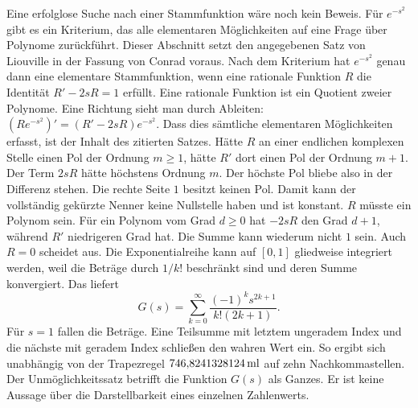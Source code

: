 Eine erfolglose Suche nach einer Stammfunktion wäre noch kein Beweis. Für \(e^{-s^2}\) gibt es ein Kriterium, das alle elementaren Möglichkeiten auf eine Frage über Polynome zurückführt. Dieser Abschnitt setzt den angegebenen Satz von Liouville in der Fassung von Conrad voraus.
Nach dem Kriterium hat \(e^{-s^2}\) genau dann eine elementare Stammfunktion, wenn eine rationale Funktion \(R\) die Identität \(R'-2sR=1\) erfüllt. Eine rationale Funktion ist ein Quotient zweier Polynome. Eine Richtung sieht man durch Ableiten: \((Re^{-s^2})'=(R'-2sR)e^{-s^2}\). Dass dies sämtliche elementaren Möglichkeiten erfasst, ist der Inhalt des zitierten Satzes.
Hätte \(R\) an einer endlichen komplexen Stelle einen Pol der Ordnung \(m\ge1\), hätte \(R'\) dort einen Pol der Ordnung \(m+1\). Der Term \(2sR\) hätte höchstens Ordnung \(m\). Der höchste Pol bliebe also in der Differenz stehen. Die rechte Seite \(1\) besitzt keinen Pol. Damit kann der vollständig gekürzte Nenner keine Nullstelle haben und ist konstant. \(R\) müsste ein Polynom sein. Für ein Polynom vom Grad \(d\ge0\) hat \(-2sR\) den Grad \(d+1\), während \(R'\) niedrigeren Grad hat. Die Summe kann wiederum nicht \(1\) sein. Auch \(R=0\) scheidet aus.
Die Exponentialreihe kann auf \([0,1]\) gliedweise integriert werden, weil die Beträge durch \(1/k!\) beschränkt sind und deren Summe konvergiert. Das liefert
\[
 G(s)=\sum_{k=0}^\infty\frac{(-1)^k s^{2k+1}}{k!(2k+1)}.
\]
Für \(s=1\) fallen die Beträge. Eine Teilsumme mit letztem ungeradem Index und die nächste mit geradem Index schließen den wahren Wert ein. So ergibt sich unabhängig von der Trapezregel \(746{,}8241328124\,\mathrm{ml}\) auf zehn Nachkommastellen. Der Unmöglichkeitssatz betrifft die Funktion \(G(s)\) als Ganzes. Er ist keine Aussage über die Darstellbarkeit eines einzelnen Zahlenwerts.


